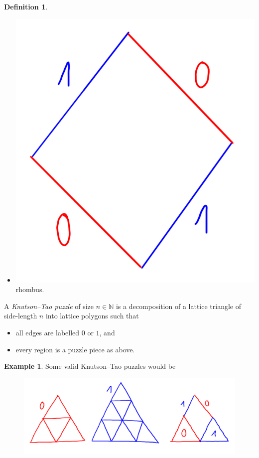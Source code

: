 \documentclass[12pt,a4paper]{amsart}
\theoremstyle{plain}
\theoremstyle{definition}
\newtheorem{defn}[thm]{Definition}
\newtheorem{exmp}[thm]{Example}
\theoremstyle{remark}
\begin{document}
\begin{defn}
\begin{itemize}
    \item \includegraphics[scale=.2]{pictures/rhombus} rhombus.
  \end{itemize}
  A \textit{Knutson--Tao puzzle} of size $n \in \mathbb{N}$ is a decomposition of a lattice triangle of side-length $n$ into lattice polygons such that
  \begin{itemize}
    \item all edges are labelled \color{red}$0$ \color{black} or \color{blue}$1$\color{black}, and
    \item every region is a puzzle piece as above.
  \end{itemize}
\end{defn}

\begin{exmp}
  Some valid Knutson--Tao puzzles would be
  \begin{figure}[H]
    \centering
    \includegraphics[scale=.7]{pictures/knutsontaoexmp}
  \end{figure}
\end{exmp}
\end{document}
